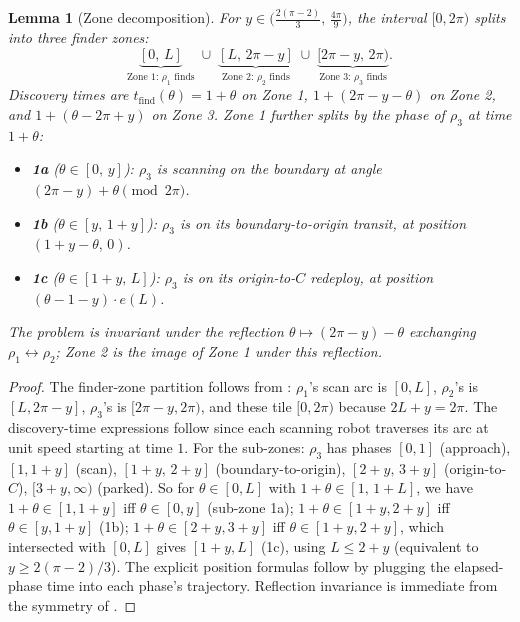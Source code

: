 \documentclass[11pt]{article}
\theoremstyle{plain}
\newtheorem{lemma}[theorem]{Lemma}
\theoremstyle{definition}
\theoremstyle{remark}
\begin{document}
\begin{lemma}[Zone decomposition]
\label{lem:zones}
For $y \in \bigl(\tfrac{2(\pi-2)}{3},\, \tfrac{4\pi}{9}\bigr)$, the
interval $[0, 2\pi)$ splits into three \emph{finder zones}:
\[
\underbrace{[0,\, L]}_{\text{Zone 1: } \rho_1 \text{ finds}} \;\cup\;
\underbrace{[L,\, 2\pi - y]}_{\text{Zone 2: } \rho_2 \text{ finds}} \;\cup\;
\underbrace{[2\pi - y,\, 2\pi)}_{\text{Zone 3: } \rho_3 \text{ finds}}.
\]
Discovery times are $t_{\mathrm{find}}(\theta) = 1 + \theta$ on Zone 1,
$1 + (2\pi - y - \theta)$ on Zone 2, and $1 + (\theta - 2\pi + y)$ on
Zone 3. Zone 1 further splits by the phase of $\rho_3$ at time
$1 + \theta$:
\begin{itemize}
\item \textbf{1a} ($\theta \in [0,\, y]$): $\rho_3$ is scanning on the
boundary at angle $(2\pi - y) + \theta \pmod{2\pi}$.
\item \textbf{1b} ($\theta \in [y,\, 1+y]$): $\rho_3$ is on its
boundary-to-origin transit, at position $(1 + y - \theta,\, 0)$.
\item \textbf{1c} ($\theta \in [1+y,\, L]$): $\rho_3$ is on its
origin-to-$C$ redeploy, at position $(\theta - 1 - y)\cdot e(L)$.
\end{itemize}
The problem is invariant under the reflection $\theta \mapsto (2\pi - y)
- \theta$ exchanging $\rho_1 \leftrightarrow \rho_2$; Zone 2 is the image
of Zone 1 under this reflection.
\end{lemma}

\begin{proof}
The finder-zone partition follows from : $\rho_1$'s scan
arc is $[0, L]$, $\rho_2$'s is $[L, 2\pi - y]$, $\rho_3$'s is $[2\pi -
y, 2\pi)$, and these tile $[0, 2\pi)$ because $2L + y = 2\pi$. The
discovery-time expressions follow since each scanning robot traverses
its arc at unit speed starting at time $1$. For the sub-zones: $\rho_3$
has phases $[0,1]$ (approach), $[1, 1+y]$ (scan), $[1+y,\, 2+y]$
(boundary-to-origin), $[2+y,\, 3+y]$ (origin-to-$C$), $[3+y, \infty)$
(parked). So for $\theta \in [0, L]$ with $1 + \theta \in [1,\, 1+L]$,
we have $1 + \theta \in [1, 1+y]$ iff $\theta \in [0, y]$ (sub-zone
1a); $1 + \theta \in [1+y, 2+y]$ iff $\theta \in [y, 1+y]$ (1b); $1 +
\theta \in [2+y, 3+y]$ iff $\theta \in [1+y, 2+y]$, which intersected
with $[0, L]$ gives $[1+y, L]$ (1c), using $L \le 2 + y$ (equivalent to
$y \ge 2(\pi-2)/3$). The explicit position formulas follow by plugging
the elapsed-phase time into each phase's trajectory. Reflection
invariance is immediate from the symmetry of .
\end{proof}
\end{document}
